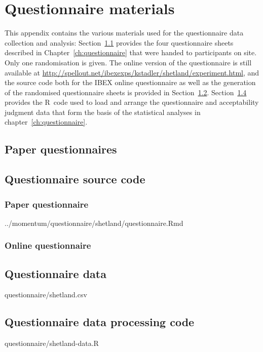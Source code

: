 \documentclass[oneside]{book}
\newcommand{\includeR}[1]{#1}
\begin{document}
\chapter{Questionnaire materials}
\label{app:questionnaire}
This appendix contains the various materials used for the questionnaire data collection and analysis: Section~\ref{app:paperquestionnaire} provides the four questionnaire sheets described in Chapter~\ref{ch:questionnaire} that were handed to participants on site. Only one randomisation is given. The online version of the questionnaire is still available at \url{http://spellout.net/ibexexps/kstadler/shetland/experiment.html}, and the source code both for the IBEX online questionnaire as well as the generation of the randomised questionnaire sheets is provided in Section~\ref{app:questionnairecode}. Section~\ref{app:questionnairedatacode} provides the R~code used to load and arrange the questionnaire and acceptability judgment data that form the basis of the statistical analyses in chapter~\ref{ch:questionnaire}.

\section{Paper questionnaires}
\label{app:paperquestionnaire}
%
\section{Questionnaire source code}
\label{app:questionnairecode}
\subsection{Paper questionnaire}

\includeR{../momentum/questionnaire/shetland/questionnaire.Rmd}
\subsection{Online questionnaire}

\section{Questionnaire data}
\includeR{questionnaire/shetland.csv}

\section{Questionnaire data processing code}
\label{app:questionnairedatacode}

\includeR{questionnaire/shetland-data.R}
\end{document}
